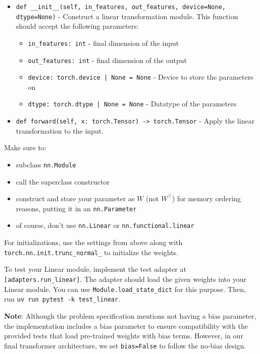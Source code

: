 \begin{itemize}
    \item \lstinline{def __init__(self, in_features, out_features, device=None, dtype=None)} - Construct a linear transformation module. This function should accept the following parameters:
    \begin{itemize}
        \item \lstinline{in_features: int} - final dimension of the input
        \item \lstinline{out_features: int} - final dimension of the output
        \item \lstinline{device: torch.device | None = None} - Device to store the parameters on
        \item \lstinline{dtype: torch.dtype | None = None} - Datatype of the parameters
    \end{itemize}
    
    \item \lstinline{def forward(self, x: torch.Tensor) -> torch.Tensor} - Apply the linear transformation to the input.
\end{itemize}

Make sure to:
\begin{itemize}
    \item subclass \lstinline{nn.Module}
    \item call the superclass constructor
    \item construct and store your parameter as $W$ (not $W^\top$) for memory ordering reasons, putting it in an \lstinline{nn.Parameter}
    \item of course, don't use \lstinline{nn.Linear} or \lstinline{nn.functional.linear}
\end{itemize}

For initializations, use the settings from above along with \lstinline{torch.nn.init.trunc_normal_} to initialize the weights.

To test your Linear module, implement the test adapter at \texttt{[adapters.run\_linear]}. The adapter should load the given weights into your Linear module. You can use \lstinline{Module.load_state_dict} for this purpose. Then, run \texttt{uv run pytest -k test\_linear}.

\begin{answer}
\textbf{Note}: Although the problem specification mentions not having a bias parameter, the implementation includes a bias parameter to ensure compatibility with the provided tests that load pre-trained weights with bias terms. However, in our final transformer architecture, we set \lstinline{bias=False} to follow the no-bias design.
\end{answer}

